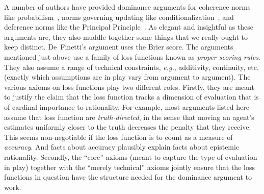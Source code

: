 \documentclass[11pt]{article}
\theoremstyle{definition}
\theoremstyle{remark}
\begin{document}
A number of authors have provided dominance arguments for coherence norms like probabilism~\cite{Joyce2009,Predd2009,SSK2009,Pettigrew2022,Nielsen2023}, norms governing updating like conditionalization~\cite{Briggs2020,Nielsen2021}, and deference norms like the Principal Principle~\cite[Chapter~10]{Pettigrew2016}. As elegant and insightful as these arguments are, they also muddle together some things that we really ought to keep distinct. De~Finetti's argument uses the Brier score. The arguments mentioned just above use a family of loss functions known as \textit{proper scoring rules}. They also assume a range of technical constraints, \textit{e.g.}, additivity, continuity, etc. (exactly which assumptions are in play vary from argument to argument). The various axioms on loss functions play two different roles. Firstly, they are meant to justify the claim that the loss function tracks a dimension of evaluation that is of cardinal importance to rationality. For example, most arguments listed here assume that loss function are \textit{truth-directed}, in the sense that moving an agent's estimates uniformly closer to the truth decreases the penalty that they receive. This seems non-negotiable if the loss function is to count as a measure of \textit{accuracy}. And facts about accuracy plausibly explain facts about epistemic rationality. Secondly, the ``core'' axioms (meant to capture the type of evaluation in play) together with the ``merely technical'' axioms jointly ensure that the loss functions in question have the structure needed for the dominance argument to work.
\end{document}
